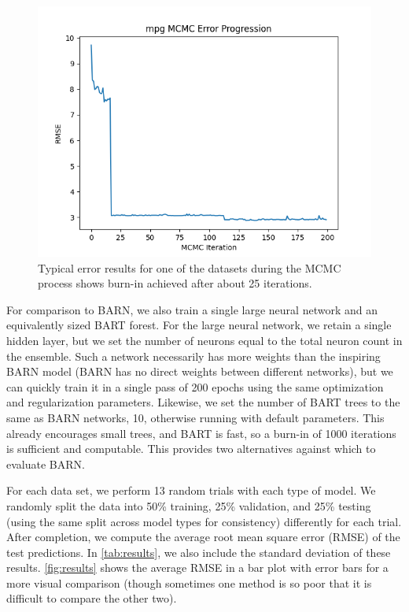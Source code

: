 \documentclass[12pt]{article}
\begin{document}
\begin{figure}[ht]
\centering
    \includegraphics[scale=0.66]{mpg_phi.png}
    \caption{Typical error results for one of the datasets during the MCMC process shows burn-in achieved after about 25 iterations.}
    \label{fig:phi}
\end{figure}

For comparison to BARN, we also train a single large neural network and an equivalently sized BART forest.  For the large neural network, we retain a single hidden layer, but we set the number of neurons equal to the total neuron count in the ensemble.  Such a network necessarily has more weights than the inspiring BARN model (BARN has no direct weights between different networks), but we can quickly train it in a single pass of 200 epochs using the same optimization and regularization parameters.  Likewise, we set the number of BART trees to the same as BARN networks, 10, otherwise running with default parameters.  This already encourages small trees, and BART is fast, so a burn-in of 1000 iterations is sufficient and computable.  This provides two alternatives against which to evaluate BARN.

For each data set, we perform 13 random trials with each type of model.  We randomly split the data into 50\% training, 25\% validation, and 25\% testing (using the same split across model types for consistency) differently for each trial.  After completion, we compute the average root mean square error (RMSE) of the test predictions.  In \autoref{tab:results}, we also include the standard deviation of these results.  \autoref{fig:results} shows the average RMSE in a bar plot with error bars for a more visual comparison (though sometimes one method is so poor that it is difficult to compare the other two).
\end{document}
